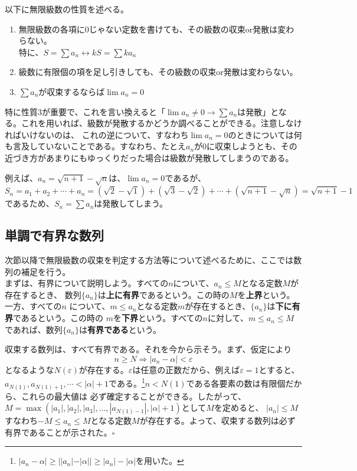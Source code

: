 \documentclass[a4j,dvipdfmx]{jsarticle}
\begin{document}
                以下に無限級数の性質を述べる。
                \begin{enumerate}
                    \item 無限級数の各項に0じゃない定数を書けても、その級数の収束or発散は変わらない。\\特に、$S=\sum a_n\leftrightarrow kS=\sum k a_n$
                    \item 級数に有限個の項を足し引きしても、その級数の収束or発散は変わらない。
                    \item $\sum a_n$が収束するならば$\lim a_n=0$
                \end{enumerate}
                特に性質3が重要で、これを言い換えると「$\lim a_n \neq 0 \rightarrow \sum a_n$は発散」となる。これを用いれば、級数が発散するかどうか調べることができる。注意しなければいけないのは、
                これの逆について、すなわち$\lim a_n=0$のときについては何も言及していないことである。すなわち、たとえ$a_n$が0に収束しようとも、その近づき方があまりにもゆっくりだった場合は級数が発散してしまうのである。

                例えば、$a_n=\sqrt{n+1}-\sqrt{n}$は、$\lim a_n = 0$であるが、
                \begin{equation*}
                    S_n = a_1+a_2+\cdots+a_n = (\sqrt{2}-\sqrt{1})+(\sqrt{3}-\sqrt{2})+\cdots+(\sqrt{n+1}-\sqrt{n})=\sqrt{n+1}-1
                \end{equation*}
                であるため、$S_n=\sum a_n$は発散してしまう。
            \clearpage
            \subsection{単調で有界な数列}
                次節以降で無限級数の収束を判定する方法等について述べるために、ここでは数列の補足を行う。\\

                まずは、有界について説明しよう。すべての$n$について、$a_n\leq M$となる定数$M$が存在するとき、
                数列$\{a_n\}$は\textbf{上に有界}であるという。この時の$M$を\textbf{上界}という。一方、すべての$n$
                について、$m\leq a_n$となる定数$m$が存在するとき、$\{a_n\}$は\textbf{下に有界}であるという。この時の
                $m$を\textbf{下界}という。すべての$n$に対して、$m\leq a_n \leq M$であれば、数列$\{a_n\}$は\textbf{有界である}という。

                収束する数列は、すべて有界である。それを今から示そう。まず、仮定により
                \begin{equation*}
                    n \geq  N \Rightarrow |a_n - \alpha|<\varepsilon
                \end{equation*}
                となるような$N(\varepsilon)$が存在する。$\varepsilon$は任意の正数だから、例えば$\varepsilon=1$とすると、
                $a_{N(1)},a_{N(1)+1},\cdots < |\alpha|+1$である。\footnote{$|a_n-\alpha|\geq ||a_n|-|\alpha||\geq |a_n|-|\alpha|$を用いた。}$n<N(1)$である各要素の数は有限個だから、これらの最大値は
                必ず確定することができる。したがって、$M=\max(|a_1|,|a_2|,|a_3|,\dots,|a_{N(1)-1}|,|\alpha|+1)$として$M$を定めると、
                $|a_n| \leq M$すなわち$-M\leq a_n \leq M$となる定数$M$が存在する。よって、収束する数列は必ず有界であることが示された。$\square$
\end{document}
